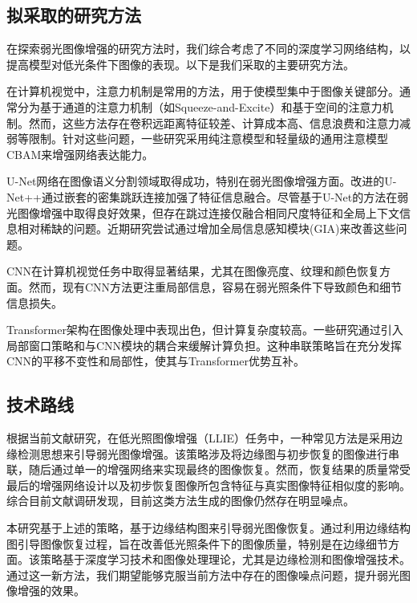 \documentclass[a4paper]{ctexart}
\begin{document}
	\subsection{拟采取的研究方法}
	
	在探索弱光图像增强的研究方法时，我们综合考虑了不同的深度学习网络结构，以提高模型对低光条件下图像的表现。以下是我们采取的主要研究方法。
	
	在计算机视觉中，注意力机制是常用的方法，用于使模型集中于图像关键部分。通常分为基于通道的注意力机制（如Squeeze-and-Excite）和基于空间的注意力机制\cite{woo2018cbam}。然而，这些方法存在卷积远距离特征较差、计算成本高、信息浪费和注意力减弱等限制。针对这些问题，一些研究采用纯注意模型\cite{ramachandran2019stand}和轻量级的通用注意模型CBAM\cite{woo2018cbam}来增强网络表达能力。
	
	U-Net网络在图像语义分割领域取得成功，特别在弱光图像增强方面\cite{chen2018learning}。改进的U-Net++\cite{zhou2018unet++,zhou2019unet++}通过嵌套的密集跳跃连接加强了特征信息融合。尽管基于U-Net的方法在弱光图像增强中取得良好效果，但存在跳过连接仅融合相同尺度特征和全局上下文信息相对稀缺的问题。近期研究尝试通过增加全局信息感知模块(GIA)来改善这些问题\cite{meng2020gia}。
	
	CNN在计算机视觉任务中取得显著结果，尤其在图像亮度、纹理和颜色恢复方面\cite{xu2020learning}。然而，现有CNN方法更注重局部信息，容易在弱光照条件下导致颜色和细节信息损失。
	
	Transformer架构\cite{vaswani2017attention}在图像处理中表现出色，但计算复杂度较高\cite{dosovitskiy2020image}。一些研究通过引入局部窗口策略和与CNN模块的耦合来缓解计算负担\cite{chen2023cross}。这种串联策略旨在充分发挥CNN的平移不变性和局部性，使其与Transformer优势互补。
	
	\subsection{技术路线}

	根据当前文献研究，在低光照图像增强（LLIE）任务中，一种常见方法是采用边缘检测思想来引导弱光图像增强。该策略涉及将边缘图与初步恢复的图像进行串联，随后通过单一的增强网络来实现最终的图像恢复。然而，恢复结果的质量常受最后的增强网络设计以及初步恢复图像所包含特征与真实图像特征相似度的影响。综合目前文献调研发现，目前这类方法生成的图像仍然存在明显噪点。
	
	本研究基于上述的策略，基于边缘结构图来引导弱光图像恢复。通过利用边缘结构图引导图像恢复过程，旨在改善低光照条件下的图像质量，特别是在边缘细节方面。该策略基于深度学习技术和图像处理理论，尤其是边缘检测和图像增强技术。通过这一新方法，我们期望能够克服当前方法中存在的图像噪点问题，提升弱光图像增强的效果。
	
\end{document}
